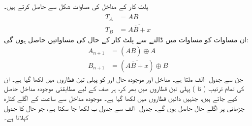 پلٹ کار کے مداخل کی مساوات شکل  سے حاصل کرتے ہیں۔
\begin{align*}
T_A&=A\overline{B}\\
T_B&=\overline{A\overline{B}+x}
\end{align*}
ان مساوات کو مساوات  میں ڈالنے سے پلٹ کار کے حال کی مساواتیں حاصل ہوں گی:
\begin{align*}
A_{n+1}&=(A\overline{B})\oplus A\\
B_{n+1}&=(\overline{A\overline{B}+x})\oplus B
\end{align*}
جن سے جدول -الف ملتا ہے۔ مداخل  اور موجودہ حال  اور  کو پہلی تین قطاروں میں لکھا گیا ہے۔ ان کی تمام ترتیب ( تا ) پہلی تین قطاروں میں بھر کر، ہر صف کے لیے مطابقتی موجودہ مداخل حاصل کیے جاتے ہیں، جنہیں دائیں قطاروں میں لکھا گیا ہے۔ موجودہ مداخل سے ساعت کے اگلے کنارہ چڑھائی پر اگلے حال حاصل ہوں گے۔ جدول -الف سے جدول-ب لکھا جا سکتا ہے، جو حال کا جدول کہلاتا ہے۔
